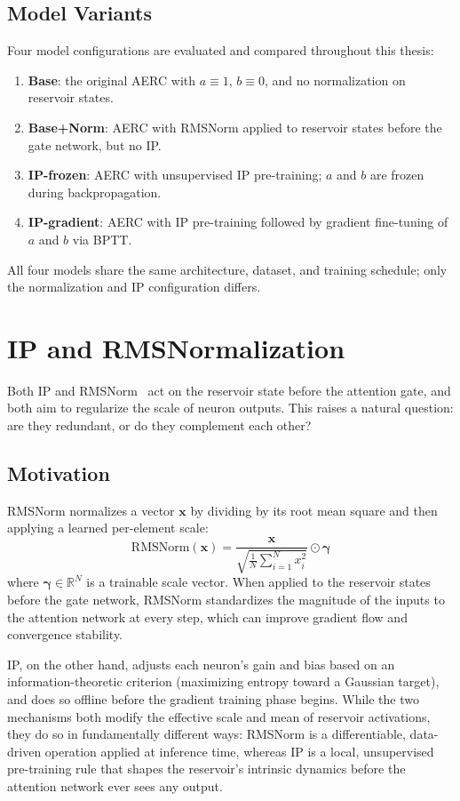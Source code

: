 \documentclass{sapthesis}
\begin{document}
\subsection{Model Variants}
Four model configurations are evaluated and compared throughout this thesis:
\begin{enumerate}
  \item \textbf{Base}: the original AERC with $a \equiv 1$, $b \equiv 0$, and no normalization on reservoir states.
  \item \textbf{Base+Norm}: AERC with RMSNorm applied to reservoir states before the gate network, but no IP.
  \item \textbf{IP-frozen}: AERC with unsupervised IP pre-training; $a$ and $b$ are frozen during backpropagation.
  \item \textbf{IP-gradient}: AERC with IP pre-training followed by gradient fine-tuning of $a$ and $b$ via BPTT.
\end{enumerate}
All four models share the same architecture, dataset, and training schedule; only the normalization and IP configuration differs.

\section{IP and RMSNormalization}
\label{sec:rmsnorm}
Both IP and RMSNorm~\cite{zhang2019root} act on the reservoir state before the attention gate, and both aim to regularize the scale of neuron outputs. This raises a natural question: are they redundant, or do they complement each other?

\subsection{Motivation}
RMSNorm normalizes a vector $\mathbf{x}$ by dividing by its root mean square and then applying a learned per-element scale:
\[
  \text{RMSNorm}(\mathbf{x}) = \frac{\mathbf{x}}{\sqrt{\frac{1}{N}\sum_{i=1}^{N} x_i^2}} \odot \boldsymbol{\gamma}
\]
where $\boldsymbol{\gamma} \in \mathbb{R}^N$ is a trainable scale vector. When applied to the reservoir states before the gate network, RMSNorm standardizes the magnitude of the inputs to the attention network at every step, which can improve gradient flow and convergence stability.

IP, on the other hand, adjusts each neuron's gain and bias based on an information-theoretic criterion (maximizing entropy toward a Gaussian target), and does so offline before the gradient training phase begins. While the two mechanisms both modify the effective scale and mean of reservoir activations, they do so in fundamentally different ways: RMSNorm is a differentiable, data-driven operation applied at inference time, whereas IP is a local, unsupervised pre-training rule that shapes the reservoir's intrinsic dynamics before the attention network ever sees any output.
\end{document}
